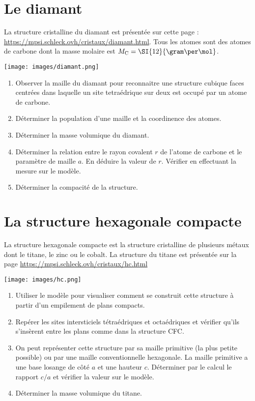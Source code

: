 \documentclass[]{tp}
\begin{document}
\section{Le diamant}
La structure cristalline du diamant est présentée sur cette page : \url{https://mpsi.schleck.ovh/cristaux/diamant.html}. Tous les atomes sont des atomes de carbone dont la masse molaire est $M_{\ce{C}} = \SI{12}{\gram\per\mol}$.
\begin{center}
  \texttt{[image: images/diamant.png]}
\end{center}
\begin{enumerate}
  \item Observer la maille du diamant pour reconnaitre une structure cubique faces centrées dans laquelle un site tetraédrique sur deux est occupé par un atome de carbone.
  \item Déterminer la population d'une maille et la coordinence des atomes.
  \item Déterminer la masse volumique du diamant.
  \item Déterminer la relation entre le rayon covalent $r$ de l'atome de carbone et le paramètre de maille $a$. En déduire la valeur de $r$. Vérifier en effectuant la mesure sur le modèle.
  \item Déterminer la compacité de la structure.
\end{enumerate}

\section{La structure hexagonale compacte}
La structure hexagonale compacte est la structure cristalline de plusieurs métaux dont le titane, le zinc ou le cobalt. La structure du titane est présentée sur la page \url{https://mpsi.schleck.ovh/cristaux/hc.html}
\begin{center}
  \texttt{[image: images/hc.png]}
\end{center}
\begin{enumerate}
  \item Utiliser le modèle pour visualiser comment se construit cette structure à partir d'un empilement de plans compacts.
  \item Repérer les sites intersticiels tétraédriques et octaédriques et vérifier qu'ils s'insèrent entre les plans comme dans la structure CFC.
  \item On peut représenter cette structure par sa maille primitive (la plus petite possible) ou par une maille conventionnelle hexagonale. La maille primitive a une base losange de côté $a$ et une hauteur $c$. Déterminer par le calcul le rapport $c/a$ et vérifier la valeur sur le modèle.  
  \item Déterminer la masse volumique du titane.
\end{enumerate}
\end{document}
